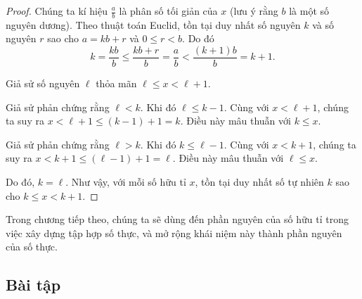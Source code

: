 \begin{proof}
    Chúng ta kí hiệu $\frac{a}{b}$ là phân số tối giản của $x$ (lưu ý rằng $b$ là một số nguyên dương). Theo thuật toán Euclid, tồn tại duy nhất số nguyên $k$ và số nguyên $r$ sao cho $a = kb + r$ và $0\leq r < b$. Do đó
    \[
        k = \frac{kb}{b} \leq \frac{kb + r}{b} = \frac{a}{b} < \frac{(k+1)b}{b} = k+1.
    \]

    Giả sử số nguyên $\ell$ thỏa mãn $\ell\leq x < \ell + 1$.

    Giả sử phản chứng rằng $\ell < k$. Khi đó $\ell\leq k - 1$. Cùng với $x < \ell + 1$, chúng ta suy ra $x < \ell + 1\leq (k-1) + 1 = k$. Điều này mâu thuẫn với $k\leq x$.

    Giả sử phản chứng rằng $\ell > k$. Khi đó $k\leq \ell - 1$. Cùng với $x < k + 1$, chúng ta suy ra $x < k + 1\leq (\ell - 1) + 1 = \ell$. Điều này mâu thuẫn với $\ell\leq x$.

    Do đó, $k = \ell$. Như vậy, với mỗi số hữu tỉ $x$, tồn tại duy nhất số tự nhiên $k$ sao cho $k\leq x < k+1$.
\end{proof}

Trong chương tiếp theo, chúng ta sẽ dùng đến phần nguyên của số hữu tỉ trong việc xây dựng tập hợp số thực, và mở rộng khái niệm này thành phần nguyên của số thực.

\subsection{Bài tập}
